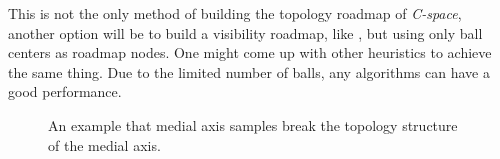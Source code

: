 \documentclass[11pt]{article}
\begin{document}
\indent This is not the only method of building the topology roadmap of \emph{C-space}, another option will be to build a visibility roadmap, like \cite{vprm}, but using only ball centers as roadmap nodes. One might come up with other heuristics to achieve the same thing. Due to the limited number of balls, any algorithms can have a good performance. 

\indent 

\begin{figure}
	\caption{\label{badthing}} An example that medial axis samples break the topology structure of the medial axis.
\end{figure}
\end{document}
